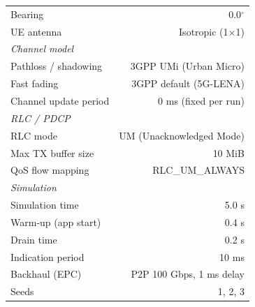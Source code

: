 \begin{table}[H]
\begin{tabular}{lr}
Bearing                      & 0.0$^\circ$ \\
UE antenna                   & Isotropic (1$\times$1) \\
\midrule
\multicolumn{2}{l}{\textit{Channel model}} \\
Pathloss / shadowing         & 3GPP UMi (Urban Micro) \\
Fast fading                  & 3GPP default (5G-LENA) \\
Channel update period        & 0 ms (fixed per run) \\
\midrule
\multicolumn{2}{l}{\textit{RLC / PDCP}} \\
RLC mode                     & UM (Unacknowledged Mode) \\
Max TX buffer size           & 10 MiB \\
QoS flow mapping             & RLC\_UM\_ALWAYS \\
\midrule
\multicolumn{2}{l}{\textit{Simulation}} \\
Simulation time              & 5.0 s \\
Warm-up (app start)          & 0.4 s \\
Drain time                   & 0.2 s \\
Indication period            & 10 ms \\
Backhaul (EPC)               & P2P 100 Gbps, 1 ms delay \\
Seeds                        & 1, 2, 3 \\
\bottomrule
\end{tabular}
\end{table}


